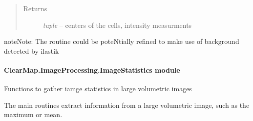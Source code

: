 \documentclass[letterpaper,10pt,english]{sphinxmanual}
\begin{document}
\begin{fulllineitems}
\begin{quote}
\begin{description}
\begin{itemize}
\end{itemize}

\item[{Returns}] \leavevmode
\emph{tuple} --
centers of the cells, intensity measurments

\end{description}\end{quote}

\begin{notice}{note}{Note:}
The routine could be poteNtially refined to make use of background
detected by ilastik
\end{notice}

\end{fulllineitems}



\paragraph{ClearMap.ImageProcessing.ImageStatistics module}
\label{api/ClearMap.ImageProcessing:module-ClearMap.ImageProcessing.ImageStatistics}\label{api/ClearMap.ImageProcessing:clearmap-imageprocessing-imagestatistics-module}
Functions to gather iamge statistics in large volumetric images

The main routines extract information from a large volumetric image, such as
the maximum or mean.
\end{document}
